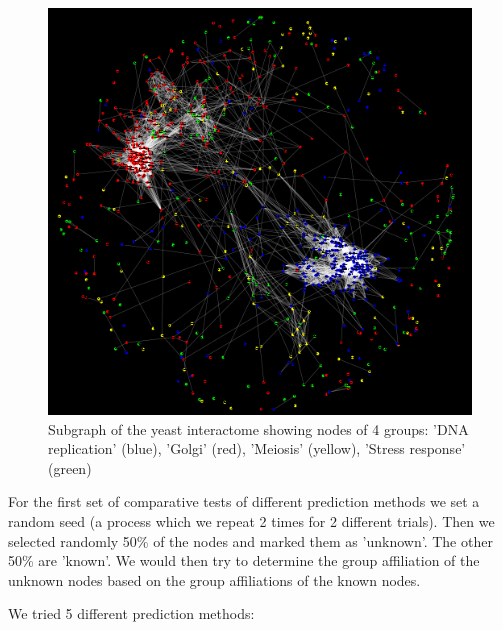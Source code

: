 \begin{figure}
\begin{framed}
\centering
\includegraphics[width=\textwidth]{figures/yeastsubgraph_4_groups_colorcode.png}
\caption{Subgraph of the yeast interactome showing nodes of 4 groups: 'DNA
replication' (blue), 'Golgi' (red), 'Meiosis' (yellow), 'Stress response'
(green)}
\label{fig:yeast_subgraph_4groups}
\end{framed}
\end{figure}

For the first set of comparative tests of different prediction
methods 
we set a random seed (a process which we repeat 2 times for 2 different trials).
Then we selected randomly 50\% of the nodes and marked them as 'unknown'. The other
50\% are 'known'. We would then try to determine the group affiliation of the
unknown nodes based on the group affiliations of the known nodes.

We tried 5 different prediction methods:

